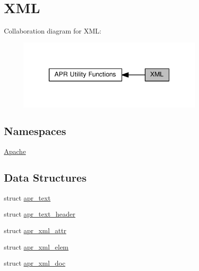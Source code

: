 \hypertarget{group__APR__Util__XML}{}\section{X\+ML}
\label{group__APR__Util__XML}
Collaboration diagram for X\+ML\+:
\nopagebreak
\begin{figure}[H]
\begin{center}
\leavevmode
\includegraphics[width=265pt]{group__APR__Util__XML}
\end{center}
\end{figure}
\subsection*{Namespaces}
\begin{DoxyCompactItemize}
\item 
 \hyperlink{namespaceApache}{Apache}
\end{DoxyCompactItemize}
\subsection*{Data Structures}
\begin{DoxyCompactItemize}
\item 
struct \hyperlink{structapr__text}{apr\+\_\+text}
\item 
struct \hyperlink{structapr__text__header}{apr\+\_\+text\+\_\+header}
\item 
struct \hyperlink{structapr__xml__attr}{apr\+\_\+xml\+\_\+attr}
\item 
struct \hyperlink{structapr__xml__elem}{apr\+\_\+xml\+\_\+elem}
\item 
struct \hyperlink{structapr__xml__doc}{apr\+\_\+xml\+\_\+doc}
\end{DoxyCompactItemize}
